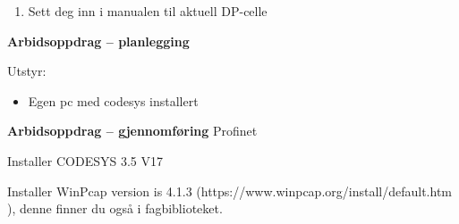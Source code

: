 \begin{enumerate}
	\item Sett deg inn i manualen til aktuell DP-celle
\end{enumerate}
\textbf{Arbidsoppdrag -- planlegging}

Utstyr:
\begin{itemize}[noitemsep]
	\item Egen pc med codesys installert 
\end{itemize}

\textbf{Arbidsoppdrag -- gjennomføring}
Profinet 

 

Installer CODESYS 3.5 V17 

Installer WinPcap version is 4.1.3  (https://www.winpcap.org/install/default.htm ), denne finner du også i fagbiblioteket. 


